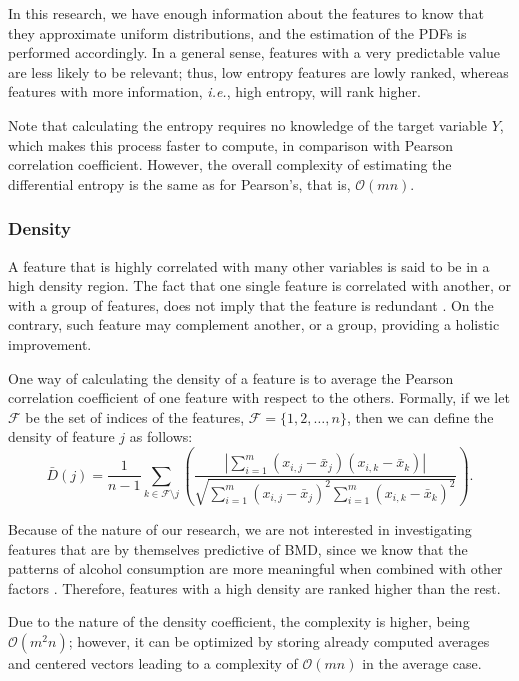 \documentclass{bmcart}
\begin{document}
In this research, we have enough information about the features to know that
they approximate uniform distributions, and the estimation of the PDFs is
performed accordingly. In a general sense, features with a very predictable
value are less likely to be relevant; thus, low entropy features are lowly
ranked, whereas features with more information, \emph{i.e.}, high entropy, will rank
higher.

Note that calculating the entropy requires no knowledge of the target
variable $Y$, which makes this process faster to compute, in comparison with
Pearson correlation coefficient. However, the overall complexity of estimating
the differential entropy is the same as for Pearson's, that is,
$\mathcal{O}(mn)$.

\subsubsection*{Density}
A feature that is highly correlated with many other variables is said to be 
in a high density region. The fact that one single feature is correlated with
another, or with a group of features, does not imply that the feature is
redundant \cite{guyon2008feature}. On the contrary, such feature may complement
another, or a group, providing a holistic improvement.

One way of calculating the density of a feature is to average the Pearson
correlation coefficient of one feature with respect to the others. Formally, if
we let $\mathcal{F}$ be the set of indices of the features, $\mathcal{F}=\{1, 2,
\dots, n \}$, then we can define the density of feature $j$ as follows:
\begin{equation}
\bar{D}(j) = \frac{1}{n-1} \sum_{k \in \mathcal{F} \setminus j} \left( 
\frac{\left| \sum_{i=1}^m (x_{i,j} - \bar{x}_j) (x_{i,k} -\bar{x}_k)\right|}
{\sqrt{\sum_{i=1}^m (x_{i,j}-\bar{x}_j)^2 \sum_{i=1}^m(x_{i,k}-\bar{x}_k)^2}} 
\right) .
\end{equation}

Because of the nature of our research, we are not interested in investigating
features that are by themselves predictive of BMD, since we know that the
patterns of alcohol consumption are more meaningful when combined with other
factors \cite{grant2008drinking,baker2014chronic,alex2015}. Therefore, features
with a high density are ranked higher than the rest.

Due to the nature of the density coefficient, the complexity is higher,
being $\mathcal{O}(m^2n)$; however, it can be optimized by storing already
computed averages and centered vectors leading to a complexity of
$\mathcal{O}(mn)$ in the average case.
\end{document}
